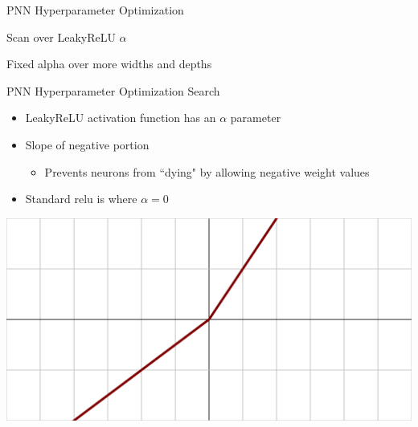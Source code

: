 \documentclass[aspectratio=169,xcolor=table]{beamer}
\begin{document}
\begin{frame}[t]{PNN Hyperparameter Optimization}
\begin{itemize}
\begin{itemize}
\begin{multicols}{2}
          \item Scan over LeakyReLU $\alpha$
          \item Fixed alpha over more widths and depths
          \end{multicols}
        \end{itemize}
      \end{itemize}
    \end{frame}

    \begin{frame}[t]{PNN Hyperparameter Optimization Search}
      \begin{itemize}
        \item LeakyReLU activation function has an $\alpha$ parameter
        \item Slope of negative portion
        \begin{itemize}
          \item Prevents neurons from ``dying" by allowing negative weight values
        \end{itemize}
        \item Standard relu is where $\alpha=0$
      \end{itemize}
      \centering
      \includegraphics[height=.4\textheight,keepaspectratio=true]{Activation_prelu.svg.png}
    \end{frame}
\end{document}

